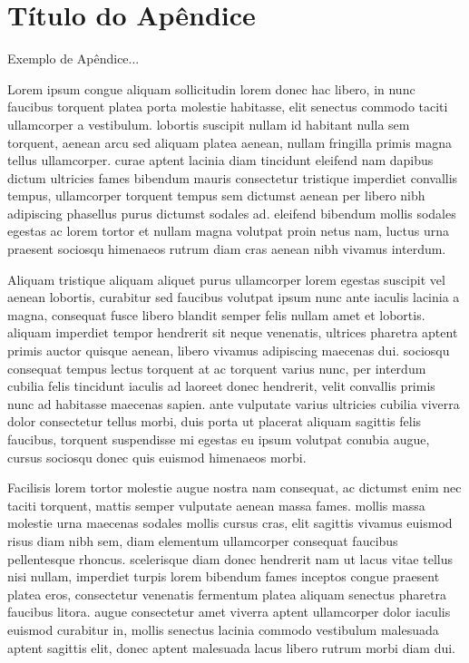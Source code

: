 \chapter{Título do Apêndice}

Exemplo de Apêndice...

Lorem ipsum congue aliquam sollicitudin lorem donec hac libero, in nunc faucibus torquent platea porta molestie habitasse, elit senectus commodo taciti ullamcorper a vestibulum. lobortis suscipit nullam id habitant nulla sem torquent, aenean arcu sed aliquam platea aenean, nullam fringilla primis magna tellus ullamcorper. curae aptent lacinia diam tincidunt eleifend nam dapibus dictum ultricies fames bibendum mauris consectetur tristique imperdiet convallis tempus, ullamcorper torquent tempus sem dictumst aenean per libero nibh adipiscing phasellus purus dictumst sodales ad. eleifend bibendum mollis sodales egestas ac lorem tortor et nullam magna volutpat proin netus nam, luctus urna praesent sociosqu himenaeos rutrum diam cras aenean nibh vivamus interdum. 

Aliquam tristique aliquam aliquet purus ullamcorper lorem egestas suscipit vel aenean lobortis, curabitur sed faucibus volutpat ipsum nunc ante iaculis lacinia a magna, consequat fusce libero blandit semper felis nullam amet et lobortis. aliquam imperdiet tempor hendrerit sit neque venenatis, ultrices pharetra aptent primis auctor quisque aenean, libero vivamus adipiscing maecenas dui. sociosqu consequat tempus lectus torquent at ac torquent varius nunc, per interdum cubilia felis tincidunt iaculis ad laoreet donec hendrerit, velit convallis primis nunc ad habitasse maecenas sapien. ante vulputate varius ultricies cubilia viverra dolor consectetur tellus morbi, duis porta ut placerat aliquam sagittis felis faucibus, torquent suspendisse mi egestas eu ipsum volutpat conubia augue, cursus sociosqu donec quis euismod himenaeos morbi. 

Facilisis lorem tortor molestie augue nostra nam consequat, ac dictumst enim nec taciti torquent, mattis semper vulputate aenean massa fames. mollis massa molestie urna maecenas sodales mollis cursus cras, elit sagittis vivamus euismod risus diam nibh sem, diam elementum ullamcorper consequat faucibus pellentesque rhoncus. scelerisque diam donec hendrerit nam ut lacus vitae tellus nisi nullam, imperdiet turpis lorem bibendum fames inceptos congue praesent platea eros, consectetur venenatis fermentum platea aliquam senectus pharetra faucibus litora. augue consectetur amet viverra aptent ullamcorper dolor iaculis euismod curabitur in, mollis senectus lacinia commodo vestibulum malesuada aptent sagittis elit, donec aptent malesuada lacus libero rutrum morbi diam dui. 

